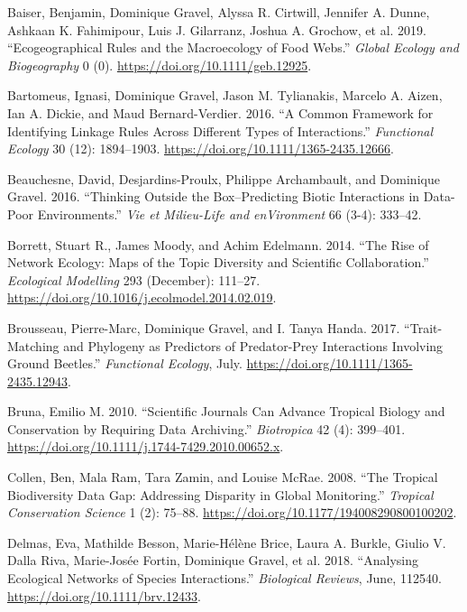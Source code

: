 \leavevmode\hypertarget{ref-BaisGrav19}{}%
Baiser, Benjamin, Dominique Gravel, Alyssa R. Cirtwill, Jennifer A.
Dunne, Ashkaan K. Fahimipour, Luis J. Gilarranz, Joshua A. Grochow, et
al. 2019. ``Ecogeographical Rules and the Macroecology of Food Webs.''
\emph{Global Ecology and Biogeography} 0 (0).
\url{https://doi.org/10.1111/geb.12925}.

\leavevmode\hypertarget{ref-BartGrav16}{}%
Bartomeus, Ignasi, Dominique Gravel, Jason M. Tylianakis, Marcelo A.
Aizen, Ian A. Dickie, and Maud Bernard-Verdier. 2016. ``A Common
Framework for Identifying Linkage Rules Across Different Types of
Interactions.'' \emph{Functional Ecology} 30 (12): 1894--1903.
\url{https://doi.org/10.1111/1365-2435.12666}.

\leavevmode\hypertarget{ref-BeauDesj16}{}%
Beauchesne, David, Desjardins-Proulx, Philippe Archambault, and
Dominique Gravel. 2016. ``Thinking Outside the Box--Predicting Biotic
Interactions in Data-Poor Environments.'' \emph{Vie et Milieu-Life and
enVironment} 66 (3-4): 333--42.

\leavevmode\hypertarget{ref-BorrMood14}{}%
Borrett, Stuart R., James Moody, and Achim Edelmann. 2014. ``The Rise of
Network Ecology: Maps of the Topic Diversity and Scientific
Collaboration.'' \emph{Ecological Modelling} 293 (December): 111--27.
\url{https://doi.org/10.1016/j.ecolmodel.2014.02.019}.

\leavevmode\hypertarget{ref-BrouGrav17}{}%
Brousseau, Pierre-Marc, Dominique Gravel, and I. Tanya Handa. 2017.
``Trait-Matching and Phylogeny as Predictors of Predator-Prey
Interactions Involving Ground Beetles.'' \emph{Functional Ecology},
July. \url{https://doi.org/10.1111/1365-2435.12943}.

\leavevmode\hypertarget{ref-Brun10}{}%
Bruna, Emilio M. 2010. ``Scientific Journals Can Advance Tropical
Biology and Conservation by Requiring Data Archiving.''
\emph{Biotropica} 42 (4): 399--401.
\url{https://doi.org/10.1111/j.1744-7429.2010.00652.x}.

\leavevmode\hypertarget{ref-CollRam08}{}%
Collen, Ben, Mala Ram, Tara Zamin, and Louise McRae. 2008. ``The
Tropical Biodiversity Data Gap: Addressing Disparity in Global
Monitoring.'' \emph{Tropical Conservation Science} 1 (2): 75--88.
\url{https://doi.org/10.1177/194008290800100202}.

\leavevmode\hypertarget{ref-DelmBess18}{}%
Delmas, Eva, Mathilde Besson, Marie-Hélène Brice, Laura A. Burkle,
Giulio V. Dalla Riva, Marie-Josée Fortin, Dominique Gravel, et al. 2018.
``Analysing Ecological Networks of Species Interactions.''
\emph{Biological Reviews}, June, 112540.
\url{https://doi.org/10.1111/brv.12433}.

